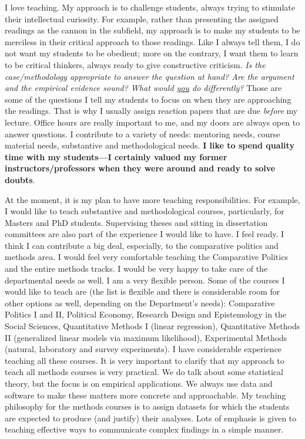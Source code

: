 \documentclass[10pt,stdletter,dateno,sigleft]{newlfm} %
\begin{document}
\begin{newlfm}
I love teaching. My approach is to challenge students, always trying to stimulate their intellectual curiosity. For example, rather than presenting the assigned readings as the cannon in the subfield, my approach is to make my students to be merciless in their critical approach to those readings. Like I always tell them, I do not want my students to be obedient; more on the contrary, I want them to learn to be critical thinkers, always ready to give constructive criticism. \emph{Is the case/methodology appropriate to answer the question at hand? Are the argument and the empirical evidence sound? What would \underline{you} do differently?} Those are some of the questions I tell my students to focus on when they are approaching the readings. That is why I usually assign reaction papers that are due \emph{before} my lecture. Office hours are really important to me, and my doors are always open to answer questions. I contribute to a variety of needs: mentoring needs, course material needs, substantive and methodological needs. {\bf I like to spend quality time with my students---I certainly valued my former instructors/professors when they were around and ready to solve doubts}. 

At the moment, it is my plan to have more teaching responsibilities. For example, I would like to teach substantive and methodological courses, particularly, for Masters and PhD students. Supervising theses and sitting in dissertation committees are also part of the experience I would like to have. I feel ready. I think I can contribute a big deal, especially, to the comparative politics and methods area. I would feel very comfortable teaching the Comparative Politics and the entire methods tracks. I would be very happy to take care of the departmental needs as well. I am a very flexible person. Some of the courses I would like to teach are (the list is flexible and there is considerable room for other options as well, depending on the Department's needs): Comparative Politics I and II, Political Economy, Research Design and Epistemology in the Social Sciences, Quantitative Methods I (linear regression), Quantitative Methods II (generalized linear models via maximum likelihood), Experimental Methods (natural, laboratory and survey experiments). I have considerable experience teaching all these courses. It is very important to clarify that my approach to teach all methods courses is very practical. We do talk about some statistical theory, but the focus is on empirical applications. We always use data and software to make these matters more concrete and approachable. My teaching philosophy for the methods courses is to assign datasets for which the students are expected to produce (and justify) their analyses. Lots of emphasis is given to teaching effective ways to communicate complex findings in a simple manner.


\end{newlfm}
\end{document}
